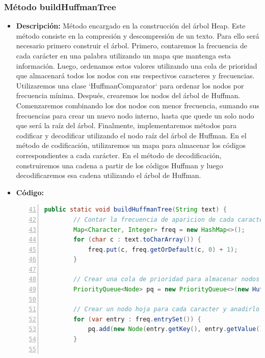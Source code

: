 \documentclass{article}
\begin{document}
  \subsubsection{Método buildHuffmanTree}
  \begin{itemize}
    \item \textbf{Descripción: }Método encargado en la construcción del árbol Heap.
    \newline
    Este método consiste en la compresión y descompresión de un texto. Para ello será necesario primero construir el árbol.
    \newline
    Primero, contaremos la frecuencia de cada carácter en una palabra utilizando un mapa que mantenga esta información. 
    Luego, ordenamos estos valores utilizando una cola de prioridad que almacenará todos los nodos con sus respectivos 
    caracteres y frecuencias. Utilizaremos una clase `HuffmanComparator` para ordenar los nodos por frecuencia mínima.
    \newline
    Después, crearemos los nodos del árbol de Huffman. Comenzaremos combinando los dos nodos con menor frecuencia, 
    sumando sus frecuencias para crear un nuevo nodo interno, hasta que quede un solo nodo que será la raíz del árbol.
    \newline
    Finalmente, implementaremos métodos para codificar y decodificar utilizando el nodo raíz del árbol de Huffman. 
    En el método de codificación, utilizaremos un mapa para almacenar los códigos correspondientes a cada carácter. 
    En el método de decodificación, construiremos una cadena a partir de los códigos Huffman y luego decodificaremos 
    esa cadena utilizando el árbol de Huffman.
    \item \textbf{Código: }
    \begin{lstlisting}[language=java, numbers=left, firstnumber=41, numberstyle=\color{orange}]
    public static void buildHuffmanTree(String text) {
        // Contar la frecuencia de aparicion de cada caracter y almacenarlo en un mapa
        Map<Character, Integer> freq = new HashMap<>();
        for (char c : text.toCharArray()) {
            freq.put(c, freq.getOrDefault(c, 0) + 1);
        }

        // Crear una cola de prioridad para almacenar nodos del arbol de Huffman
        PriorityQueue<Node> pq = new PriorityQueue<>(new HuffmanComparator());

        // Crear un nodo hoja para cada caracter y anadirlo a la cola de prioridad
        for (var entry : freq.entrySet()) {
            pq.add(new Node(entry.getKey(), entry.getValue()));
        }


\end{lstlisting}
\end{itemize}
\end{document}
